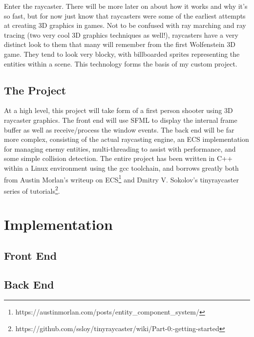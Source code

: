 \documentclass{article}
\begin{document}
Enter the raycaster. There will be more later on about how it works and why it's
so fast, but for now just know that raycasters were some of the earliest
attempts at creating 3D graphics in games. Not to be confused with ray marching
and ray tracing (two very cool 3D graphics techniques as well!), raycasters have
a very distinct look to them that many will remember from the first Wolfenstein
3D game. They tend to look very blocky, with billboarded sprites representing
the entities within a scene. This technology forms the basis of my custom
project.

\subsection{The Project}
At a high level, this project will take form of a first person shooter using
3D raycaster graphics. The front end will use SFML to display the internal frame
buffer as well as receive/process the window events. The back end will be far
more complex, consisting of the actual raycasting engine, an ECS implementation
for managing enemy entities, multi-threading to assist with performance, and
some simple collision detection. The entire project has been written in C++
within a Linux environment using the gcc toolchain, and borrows greatly both
from Austin Morlan's writeup on ECS\footnote{https://austinmorlan.com/posts/entity\_component\_system/}
and Dmitry V. Sokolov's tinyraycaster series of tutorials\footnote{https://github.com/ssloy/tinyraycaster/wiki/Part-0:-getting-started}.

\section{Implementation}

\subsection{Front End}

\subsection{Back End}

\end{document}

